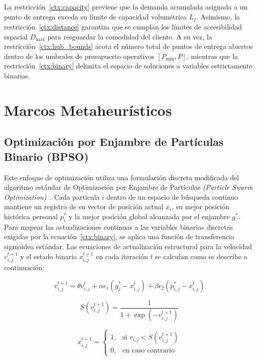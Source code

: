 \documentclass[final,5p,times,twocolumn]{elsarticle}
\begin{document}
La restricción~\eqref{ctx:capacity} previene que la demanda acumulada asignada a un punto de entrega exceda su límite de capacidad volumétrica $L_j$. Asimismo, la restricción~\eqref{ctx:distance} garantiza que se cumplan los límites de accesibilidad espacial $D_{\max}$ para resguardar la comodidad del cliente. A su vez, la restricción~\eqref{ctx:hub_bounds} acota el número total de puntos de entrega abiertos dentro de los umbrales de presupuesto operativos $[P_{\min}, P]$, mientras que la restricción~\eqref{ctx:binary} delimita el espacio de soluciones a variables estrictamente binarias.

\section{Marcos Metaheurísticos}
\label{sec:metaheuristic_frameworks}

\subsection{Optimización por Enjambre de Partículas Binario (BPSO)}
Este enfoque de optimización utiliza una formulación discreta modificada del algoritmo estándar de Optimización por Enjambre de Partículas \textit{(Particle Swarm Optimization)}~\cite{Shami2022}. Cada partícula $i$ dentro de un espacio de búsqueda continuo mantiene un registro de su vector de posición actual $x_i$, su mejor posición histórica personal $p_i^*$ y la mejor posición global alcanzada por el enjambre $g^*$. Para mapear las actualizaciones continuas a las variables binarias discretas exigidas por la ecuación~\eqref{ctx:binary}, se aplica una función de transferencia sigmoidea estándar. Las ecuaciones de actualización estructural para la velocidad $v_{i,j}^{t+1}$ y el estado binario $x_{i,j}^{t+1}$ en cada iteración $t$ se calculan como se describe a continuación:

\begin{equation}
v_{i,j}^{t+1} = \theta v_{i,j}^t + \alpha \epsilon_1 \left( g_j^* - x_{i,j}^t \right) + \beta \epsilon_2 \left( p_{i,j}^* - x_{i,j}^t \right)
\label{eq:bpso_velocity}
\end{equation}

\begin{equation}
S\left( v_{i,j}^{t+1} \right) = \frac{1}{1 + \exp\left( -v_{i,j}^{t+1} \right)}
\label{eq:bpso_sigmoid}
\end{equation}

\begin{equation}
x_{i,j}^{t+1} = \begin{cases} 
1, & \text{si } r_{i,j} < S\left( v_{i,j}^{t+1} \right) \\ 
0, & \text{en caso contrario} 
\end{cases}
\label{eq:bpso_position}
\end{equation}
\end{document}
